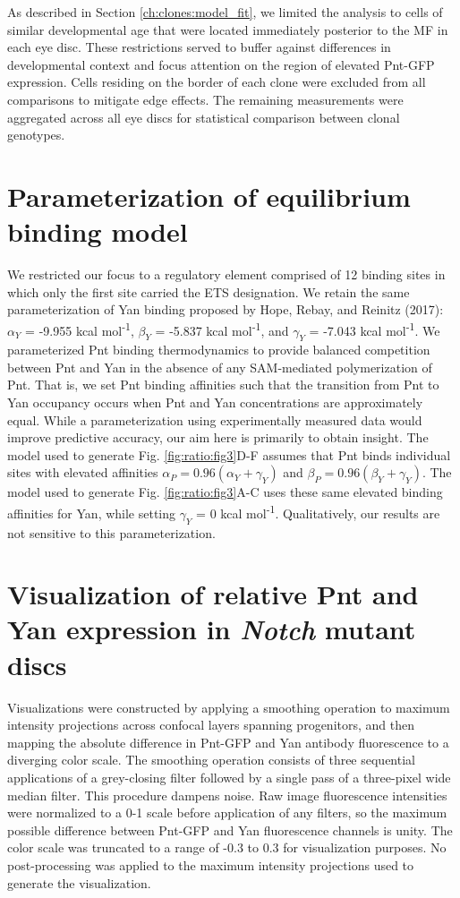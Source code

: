 As described in Section \ref{ch:clones:model_fit}, we limited the analysis to cells of similar developmental age that were located immediately posterior to the MF in each eye disc. These restrictions served to buffer against differences in developmental context and focus attention on the region of elevated Pnt-GFP expression. Cells residing on the border of each clone were excluded from all comparisons to mitigate edge effects. The remaining measurements were aggregated across all eye discs for statistical comparison between clonal genotypes.

\section{Parameterization of equilibrium binding model}
\label{appendix:ratio:model_params}

We restricted our focus to a regulatory element comprised of 12 binding sites in which only the first site carried the ETS designation. We retain the same parameterization of Yan binding proposed by Hope, Rebay, and Reinitz (2017): $\alpha_Y$ = -9.955 kcal mol\textsuperscript{-1}, $\beta_Y$ = -5.837 kcal mol\textsuperscript{-1}, and $\gamma_Y$ = -7.043 kcal mol\textsuperscript{-1}. We parameterized Pnt binding thermodynamics to provide balanced competition between Pnt and Yan in the absence of any SAM-mediated polymerization of Pnt. That is, we set Pnt binding affinities such that the transition from Pnt to Yan occupancy occurs when Pnt and Yan concentrations are approximately equal. While a parameterization using experimentally measured data would improve predictive accuracy, our aim here is primarily to obtain insight. The model used to generate Fig. \ref{fig:ratio:fig3}D-F assumes that Pnt binds individual sites with elevated affinities $\alpha_P = 0.96 (\alpha_Y + \gamma_Y )$ and $\beta_P = 0.96 (\beta_Y + \gamma_Y )$. The model used to generate Fig. \ref{fig:ratio:fig3}A-C uses these same elevated binding affinities for Yan, while setting $\gamma_Y$ = 0 kcal mol\textsuperscript{-1}. Qualitatively, our results are not sensitive to this parameterization. 

\section{Visualization of relative Pnt and Yan expression in \textit{Notch} mutant discs}
\label{appendix:ratio:notch_images}

Visualizations were constructed by applying a smoothing operation to maximum intensity projections across confocal layers spanning progenitors, and then mapping the absolute difference in Pnt-GFP and Yan antibody fluorescence to a diverging color scale. The smoothing operation consists of three sequential applications of a grey-closing filter followed by a single pass of a three-pixel wide median filter. This procedure dampens noise. Raw image fluorescence intensities were normalized to a 0-1 scale before application of any filters, so the maximum possible difference between Pnt-GFP and Yan fluorescence channels is unity. The color scale was truncated to a range of -0.3 to 0.3 for visualization purposes. No post-processing was applied to the maximum intensity projections used to generate the visualization.

